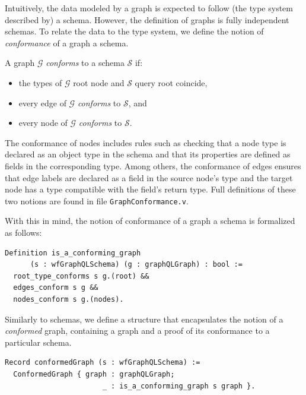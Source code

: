 Intuitively, the data modeled by a \gql graph is expected to follow (the type system described by) a schema. However, the definition of graphs is fully independent schemas. To relate the data to the type system, we define the notion of \textit{conformance} of a graph \wrt a schema.
%
\begin{definition}
A \gql graph $\mathcal{G}$ \textit{conforms} to a schema $\mathcal{S}$ if:
\begin{itemize}
    \item the types of $\mathcal{G}$ root node and $\mathcal{S}$ query root coincide, 
    \item every edge of $\mathcal{G}$ \textit{conforms} to $\mathcal{S}$, and
    \item every node of $\mathcal{G}$ \textit{conforms} to $\mathcal{S}$.
\end{itemize}
\end{definition}
%
The conformance of nodes includes rules such as checking that a node type is declared as an object type in the schema and that its properties are defined as fields in the corresponding type. Among others, the conformance of edges ensures that edge labels are declared as a field in the source node's type and the target node has a type compatible with the field's return type. Full definitions of these two notions are found in file \texttt{GraphConformance.v}.

With this in mind, the notion of conformance of a graph \wrt a schema is formalized as follows:
%
\begin{verbatim}
Definition is_a_conforming_graph 
      (s : wfGraphQLSchema) (g : graphQLGraph) : bool :=
  root_type_conforms s g.(root) &&
  edges_conform s g &&
  nodes_conform s g.(nodes).
\end{verbatim}
%

Similarly to \gql schemas, we define a structure that encapsulates the notion of a \textit{conformed} graph, containing a graph and a proof of its conformance to a particular schema.

\begin{verbatim}
Record conformedGraph (s : wfGraphQLSchema) :=
  ConformedGraph { graph : graphQLGraph;
                       _ : is_a_conforming_graph s graph }.
\end{verbatim}


